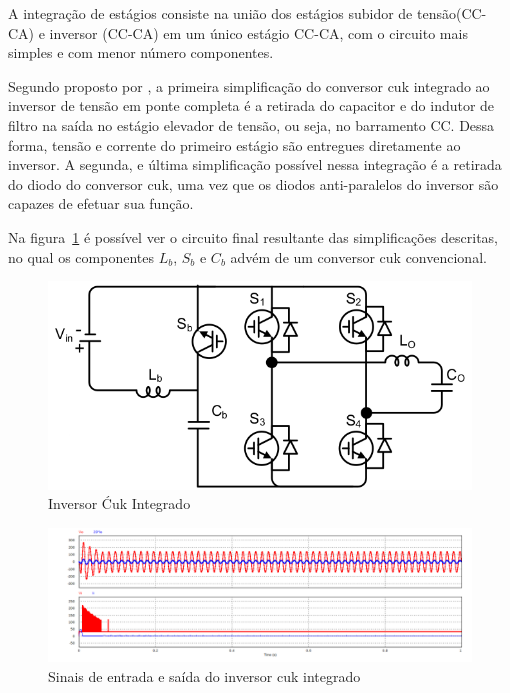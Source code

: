 \documentclass[
	12pt,				%
	openany,
	onseside,
	a4paper,			%
	english,			%
	french,				%
	spanish,			%
	brazil,				%
	]{abntex2}
\begin{document}
A integração de estágios consiste na união dos estágios subidor de tensão(CC-CA) e inversor (CC-CA) em um único estágio CC-CA, com o circuito mais simples e com menor número componentes. 

Segundo proposto por , a primeira simplificação do conversor cuk integrado ao inversor de tensão em ponte completa é a retirada do capacitor e do indutor de filtro na saída no estágio elevador de tensão, ou seja, no barramento CC. Dessa forma, tensão e corrente do primeiro estágio são entregues diretamente ao inversor. A segunda, e última simplificação possível nessa integração é a retirada do diodo do conversor cuk, uma vez que os diodos anti-paralelos do inversor são capazes de efetuar sua função.

Na figura~\ref{fig:integ_cuk_circ} é possível ver o circuito final resultante das simplificações descritas, no qual os componentes $L_b$, $S_b$ e $C_b$ advém de um conversor cuk convencional. 


\begin{figure}[H]
	\begin{center}
		\includegraphics[width=0.65 \linewidth]{integ_cuk_circ}
		\caption{Inversor Ćuk Integrado \cite{LUIGI_int_top}}
		\label{fig:integ_cuk_circ}
	\end{center}
\end{figure}

\begin{figure}[H]
	\begin{center}
		\includegraphics[width=\linewidth]{cuk_integ_In_Out}
		\caption{Sinais de entrada e saída do inversor cuk integrado}
		\label{fig:integ_cuk_In_Out}
	\end{center}
\end{figure}
\end{document}
